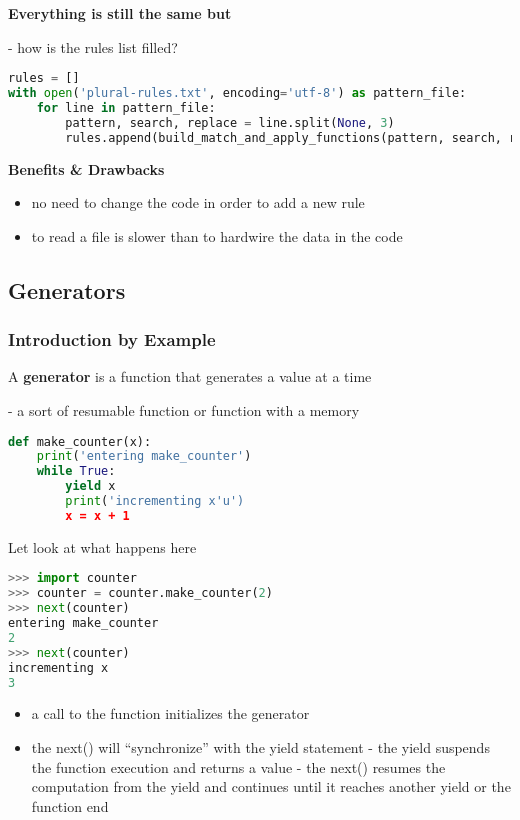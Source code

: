 \textbf{Everything is still the same but}

- how is the rules list filled?

\begin{lstlisting}[language=Python]
rules = []
with open('plural-rules.txt', encoding='utf-8') as pattern_file:
	for line in pattern_file:
		pattern, search, replace = line.split(None, 3)
		rules.append(build_match_and_apply_functions(pattern, search, replace))
\end{lstlisting}

\textbf{Benefits \& Drawbacks}

\begin{itemize}
	\item no need to change the code in order to add a new rule
	\item to read a file is slower than to hardwire the data in the code
\end{itemize}

\subsection{Generators}

\subsubsection{Introduction by Example}
 A \textbf{generator} is a function that generates a value at a time
 
 - a sort of resumable function or function with a memory
 
\begin{lstlisting}[language=Python]
def make_counter(x):
	print('entering make_counter')
	while True:
		yield x
		print('incrementing x'u')
		x = x + 1
\end{lstlisting}

Let look at what happens here
\begin{lstlisting}[language=Python]
>>> import counter
>>> counter = counter.make_counter(2)
>>> next(counter)
entering make_counter
2
>>> next(counter)
incrementing x
3
\end{lstlisting}

\begin{itemize}
	\item a call to the function initializes the generator
	\item the next() will “synchronize” with the yield statement
	- the yield suspends the function execution and returns a value
	- the next() resumes the computation from the yield and continues until it reaches another yield or the function end
\end{itemize}

